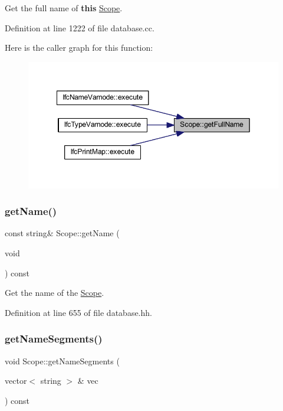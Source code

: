 Get the full name of {\bfseries{this}} \mbox{\hyperlink{class_scope}{Scope}}. 



Definition at line 1222 of file database.\+cc.

Here is the caller graph for this function\+:
\nopagebreak
\begin{figure}[H]
\begin{center}
\leavevmode
\includegraphics[width=349pt]{class_scope_a6e0c1eab94766936cb73686e39b2ab6d_icgraph}
\end{center}
\end{figure}
\mbox{\label{class_scope_abbc000357aa74b9dcf8bb91e17d9efb4}} 
\subsubsection{\texorpdfstring{getName()}{getName()}}
{\footnotesize\ttfamily const string\& Scope\+::get\+Name (\begin{DoxyParamCaption}\item[{void}]{ }\end{DoxyParamCaption}) const\hspace{0.3cm}{\ttfamily [inline]}}



Get the name of the \mbox{\hyperlink{class_scope}{Scope}}. 



Definition at line 655 of file database.\+hh.

\mbox{\label{class_scope_a0d0befa1009748f0af39a1e6b7704b7b}} 
\subsubsection{\texorpdfstring{getNameSegments()}{getNameSegments()}}
{\footnotesize\ttfamily void Scope\+::get\+Name\+Segments (\begin{DoxyParamCaption}\item[{vector$<$ string $>$ \&}]{vec }\end{DoxyParamCaption}) const}



